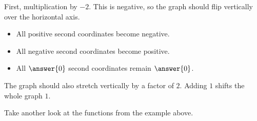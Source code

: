 \documentclass{ximera}
\begin{document}
\begin{example}
First, multiplication by $-2$. This is negative, so the graph should flip vertically over the horizontal axis. 

\begin{itemize}
\item All positive second coordinates become negative.
\item All negative second coordinates become positive.
\item All $\answer{0}$ second coordinates remain $\answer{0}$.
\end{itemize}





The graph should also stretch vertically by a factor of $2$.  Adding $1$ shifts the whole graph  $1$.








\end{example}




Take another look at the functions from the example above.
\end{document}
